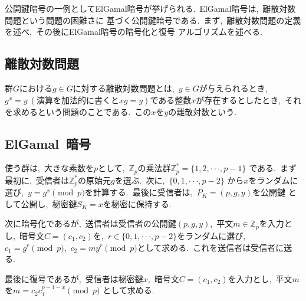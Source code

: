 公開鍵暗号の一例としてElGamal暗号が挙げられる.\ ElGamal暗号は,\ 離散対数問題という問題の困難さに
基づく公開鍵暗号である.\ まず,\ 離散対数問題の定義を述べ,\ その後にElGamal暗号の暗号化と復号
アルゴリズムを述べる.\ 

\subsection{離散対数問題}
群$G$における$g \in G$に対する離散対数問題とは,\ $y \in G$が与えられるとき,\ $g^x = y\ (演算を加法的に書くとxg = y)$である整数$x$が存在するとしたとき,\ それを求めるという問題のことである.\ この$x$を$y$の離散対数という.\ 

\subsection{ElGamal\ 暗号}
使う群は,\ 大きな素数を$p$として,\ $\mathbb{Z}_pの乗法群\mathbb{Z}_{p}^{*} = \{1,2,\cdot\cdot\cdot,p-1\}$
である.\ まず最初に,\ 受信者は$\mathbb{Z}_{p}^{*}の$原始元$g$を選ぶ.\ 次に,\ $\{0,1,\cdot\cdot\cdot,p-2\}$
から$x$をランダムに選び,\ $y = g^x\pmod{p}$を計算する.\ 最後に受信者は,\ $P_K = (p,g,y)$を公開鍵
として公開し,\ 秘密鍵$S_K = x$を秘密に保持する.\ 


次に暗号化であるが,\ 送信者は受信者の公開鍵$(p,g,y)$,\ 平文$m \in \mathbb{Z}_{p}$を入力とし,\ 
暗号文$C = (c_1,c_2)$を,\ $r \in \{0,1,\cdot\cdot\cdot,p-2\}$をランダムに選び,\ $c_1 = g^r\pmod{p}$,\ 
$c_2 = my^r\pmod{p}$として求める.\ これを送信者は受信者に送る.\


最後に復号であるが,\ 受信者は秘密鍵$x$,\ 暗号文$C = (c_1,c_2)$を入力とし,\ 平文$m$を$m = c_2c_{1}^{p-1-x}\pmod{p}$
として求める.\ 
